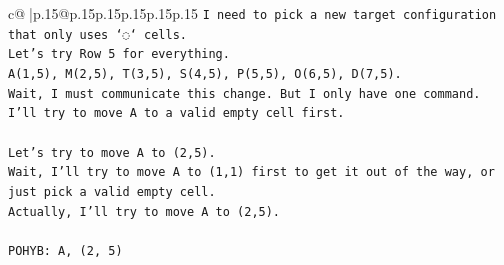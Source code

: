 \documentclass{article}
\begin{document}
{\begin{supertabular}{c@{$\;$}|p{.15\linewidth}@{}p{.15\linewidth}p{.15\linewidth}p{.15\linewidth}p{.15\linewidth}p{.15\linewidth}}
{{{\texttt{I need to pick a new target configuration that only uses `◌` cells.} \\
\texttt{Let's try Row 5 for everything.} \\
\texttt{A(1,5), M(2,5), T(3,5), S(4,5), P(5,5), O(6,5), D(7,5).} \\
\texttt{Wait, I must communicate this change. But I only have one command. I'll try to move A to a valid empty cell first.} \\
\\ 
\texttt{Let's try to move A to (2,5).} \\
\texttt{Wait, I'll try to move A to (1,1) first to get it out of the way, or just pick a valid empty cell.} \\
\texttt{Actually, I'll try to move A to (2,5).} \\
\\ 
\texttt{POHYB: A, (2, 5)} \\
            }
        }
    }
     \\ \\


\end{supertabular}}
\end{document}
